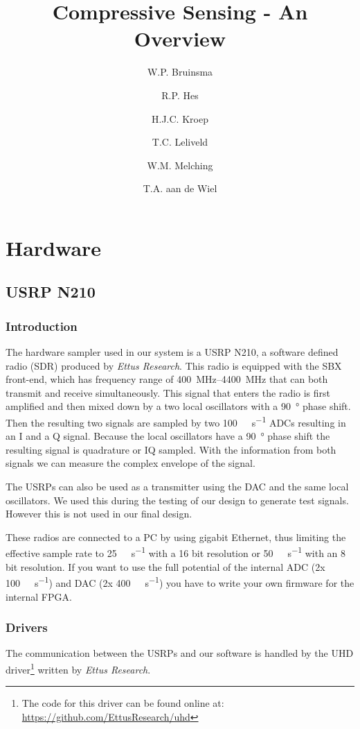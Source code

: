 \documentclass[a4paper, openany, oneside]{memoir}
\title{Compressive Sensing - An Overview}
\author{W.P. Bruinsma \and R.P. Hes \and H.J.C. Kroep \and T.C. Leliveld \and W.M. Melching \and T.A. aan de Wiel}
\begin{document}
\chapter{Hardware}

\section{USRP N210}
\label{sec:usrp-n210}

\subsection{Introduction}
The hardware sampler used in our system is a USRP N210, a software defined radio (SDR) produced by \textit{Ettus Research}. This radio is equipped with the SBX front-end, which has frequency range of \SIrange{400}{4400}{\mega\hertz} that can both transmit and receive simultaneously. This signal that enters the radio is first amplified and then mixed down by a two local oscillators with a \SI{90}{\degree} phase shift. Then the resulting two signals are sampled by two \SI{100}{\mega\sample\per\second} ADCs resulting in an I and a Q signal. Because the local oscillators have a \SI{90}{\degree} phase shift the resulting signal is quadrature or IQ sampled. With the information from both signals we can measure the complex envelope of the signal.

The USRPs can also be used as a transmitter using the DAC and the same local oscillators. We used this during the testing of our design to generate test signals. However this is not used in our final design.

These radios are connected to a PC by using gigabit Ethernet, thus limiting the effective sample rate to \SI{25}{\mega\sample\per\second} with a 16 bit resolution or \SI{50}{\mega\sample\per\second} with an 8 bit resolution. If you want to use the full potential of the internal ADC (2x \SI{100}{\mega\sample\per\second}) and DAC (2x \SI{400}{\mega\sample\per\second}) you have to write your own firmware for the internal FPGA.

\subsection{Drivers}
\label{sec:drivers}
The communication between the USRPs and our software is handled by the UHD driver\footnote{The code for this driver can be found online at: \url{https://github.com/EttusResearch/uhd}} written by \textit{Ettus Research}.
\end{document}
